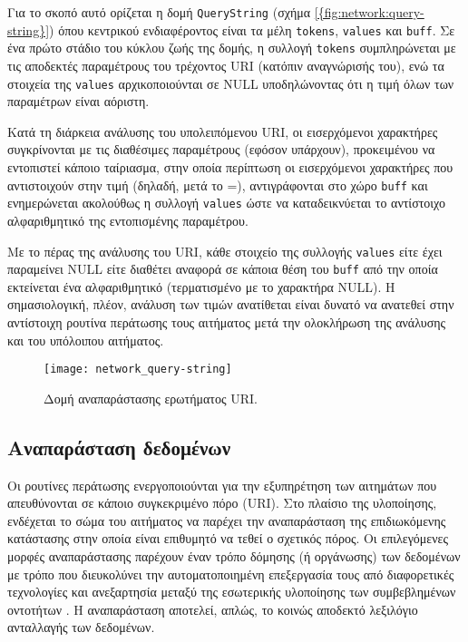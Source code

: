 Για το σκοπό αυτό ορίζεται η δομή \verb~QueryString~ (σχήμα
\ref{{fig:network:query-string}}) όπου κεντρικού ενδιαφέροντος είναι τα μέλη
\verb~tokens~, \verb~values~ και \verb~buff~. Σε ένα πρώτο στάδιο του κύκλου
ζωής της δομής, η συλλογή \verb~tokens~ συμπληρώνεται με τις αποδεκτές
παραμέτρους του τρέχοντος URI (κατόπιν αναγνώρισής του), ενώ τα στοιχεία της
\verb~values~ αρχικοποιούνται σε NULL υποδηλώνοντας ότι η τιμή όλων των
παραμέτρων είναι αόριστη.

Κατά τη διάρκεια ανάλυσης του υπολειπόμενου URI, οι εισερχόμενοι χαρακτήρες
συγκρίνονται με τις διαθέσιμες παραμέτρους (εφόσον υπάρχουν), προκειμένου να
εντοπιστεί κάποιο ταίριασμα, στην οποία περίπτωση οι εισερχόμενοι χαρακτήρες που
αντιστοιχούν στην τιμή (δηλαδή, μετά το =), αντιγράφονται στο χώρο \verb~buff~
και ενημερώνεται ακολούθως η συλλογή \verb~values~ ώστε να καταδεικνύεται το
αντίστοιχο αλφαριθμητικό της εντοπισμένης παραμέτρου.

Με το πέρας της ανάλυσης του URI, κάθε στοιχείο της συλλογής \verb~values~
είτε έχει παραμείνει NULL είτε διαθέτει αναφορά σε κάποια θέση του \verb~buff~
από την οποία εκτείνεται ένα αλφαριθμητικό (τερματισμένο με το χαρακτήρα NULL).
Η σημασιολογική, πλέον, ανάλυση των τιμών ανατίθεται είναι δυνατό να ανατεθεί
στην αντίστοιχη ρουτίνα περάτωσης τους αιτήματος μετά την ολοκλήρωση της
ανάλυσης και του υπόλοιπου αιτήματος.

\begin{figure}
    \caption{Δομή αναπαράστασης ερωτήματος URI.
    \label{fig:network:query-string}}
    \begin{center}
    \texttt{[image: network\_query-string]}
    \end{center}
\end{figure}

\subsection{Αναπαράσταση δεδομένων}

Οι ρουτίνες περάτωσης ενεργοποιούνται για την εξυπηρέτηση των αιτημάτων που
απευθύνονται σε κάποιο συγκεκριμένο πόρο (URI). Στο πλαίσιο της υλοποίησης,
ενδέχεται το σώμα του αιτήματος να παρέχει την αναπαράσταση της επιδιωκόμενης
κατάστασης στην οποία είναι επιθυμητό να τεθεί ο σχετικός πόρος. Οι επιλεγόμενες
μορφές αναπαράστασης παρέχουν έναν τρόπο δόμησης (ή οργάνωσης) των δεδομένων με
τρόπο που διευκολύνει την αυτοματοποιημένη επεξεργασία τους από διαφορετικές
τεχνολογίες και ανεξαρτησία μεταξύ της εσωτερικής υλοποίησης των συμβεβλημένων
οντοτήτων \parencite[90--92]{fielding00}. Η αναπαράσταση αποτελεί, απλώς, το
κοινώς αποδεκτό λεξιλόγιο ανταλλαγής των δεδομένων.

